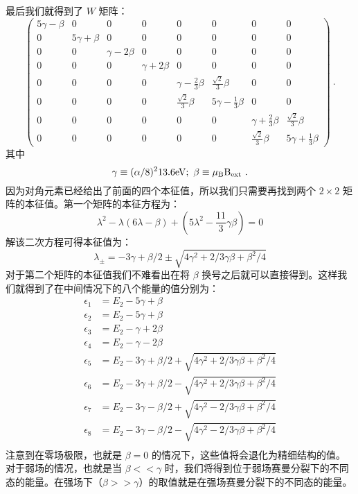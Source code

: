 最后我们就得到了 $W$ 矩阵：
\begin{equation}
\begin{pmatrix}
5\gamma -\beta & 0 & 0 & 0 & 0 & 0 & 0 & 0\\
 0 & 5\gamma +\beta  & 0 & 0 & 0 & 0 & 0 & 0\\
 0 & 0 & \gamma-2\beta & 0 & 0 & 0 & 0 & 0\\
 0 & 0 & 0 & \gamma+2\beta & 0 & 0 & 0 & 0\\
 0 & 0 & 0 & 0 & \gamma-\frac{2}{3}\beta & \frac{\sqrt{2}}{3}\beta& 0 & 0\\
 0 & 0 & 0 & 0 & \frac{\sqrt{2}}{3}\beta & 5\gamma -\frac{1}{3}\beta & 0 & 0\\
 0 & 0 & 0 & 0 & 0 & 0 & \gamma+\frac{2}{3}\beta &\frac{\sqrt{2}}{3}\beta \\
 0 & 0 & 0 & 0 & 0 & 0 & \frac{\sqrt{2}}{3}\beta & 5\gamma +\frac{1}{3}\beta
\end{pmatrix}~.
\end{equation}
其中
\begin{equation}
\gamma\equiv(\alpha/8)^2 13.6\rm{eV}; \ \beta\equiv\mu_B B_{\rm{ext}}~.
\end{equation}
因为对角元素已经给出了前面的四个本征值，所以我们只需要再找到两个 $2\times2$ 矩阵的本征值。第一个矩阵的本征方程为：
\begin{equation}
\lambda^2-\lambda(6\lambda-\beta)+(5\lambda^2-\frac{11}{3}\gamma\beta)=0
\end{equation}
解该二次方程可得本征值为：
\begin{equation}
\lambda_\pm = -3\gamma +\beta/2\pm \sqrt{4\gamma^2+2/3\gamma\beta+\beta^2/4}
\end{equation}
对于第二个矩阵的本征值我们不难看出在将 $\beta$ 换号之后就可以直接得到。这样我们就得到了在中间情况下的八个能量的值分别为：
\begin{align}
\epsilon_1 &= E_2-5\gamma+\beta\\
\epsilon_2 &= E_2-5\gamma+\beta\\
\epsilon_3 &= E_2-\gamma+2\beta\\
\epsilon_4 &= E_2-\gamma-2\beta\\
\epsilon_5 &= E_2-3\gamma +\beta/2+\sqrt{4\gamma^2+2/3\gamma\beta+\beta^2/4}\\
\epsilon_6 &= E_2-3\gamma +\beta/2-\sqrt{4\gamma^2+2/3\gamma\beta+\beta^2/4}\\
\epsilon_7 &= E_2-3\gamma -\beta/2+\sqrt{4\gamma^2-2/3\gamma\beta+\beta^2/4}\\
\epsilon_8 &= E_2-3\gamma -\beta/2-\sqrt{4\gamma^2-2/3\gamma\beta+\beta^2/4}\\
\end{align}
注意到在零场极限，也就是 $\beta=0$ 的情况下，这些值将会退化为精细结构的值。对于弱场的情况，也就是当 $\beta<<\gamma$ 时，我们将得到位于弱场赛曼分裂下的不同态的能量。在强场下（$\beta>>\gamma$）的取值就是在强场赛曼分裂下的不同态的能量。



